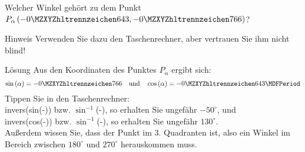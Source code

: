 \begin{MExercises}
\begin{MExercise}
Welcher Winkel geh\"ort zu dem Punkt $P_\alpha\left(-\MZahl{0}{643}, -\MZahl{0}{766}\right)$? 
\begin{MHint}{Hinweis}
Verwenden Sie dazu den Taschenrechner, aber vertrauen Sie ihm nicht blind!
\end{MHint}

\begin{MHint}{L\"osung}
Aus den Koordinaten des Punktes $P_\alpha$ ergibt sich:
\[\sin\left(\alpha\right)=-\MZahl{0}{766}\quad	\text{und}	\quad\cos\left(\alpha\right)=-\MZahl{0}{643} \MDFPeriod\]
Tippen Sie in den Taschenrechner:\\
invers(sin(-)) bzw. $\sin^{-1}$(-), so erhalten Sie ungef\"ahr $-50^\circ$, und \\
invers(cos(-)) bzw. $\sin^{-1}$(-), so erhalten Sie ungef\"ahr $130^\circ$.\\
Au\ss erdem wissen Sie, dass der Punkt im 3. Quadranten ist, also ein Winkel im Bereich zwischen $180^\circ$ und $270^\circ$ herauskommen muss.


\end{MHint}
\end{MExercise}
\end{MExercises}
